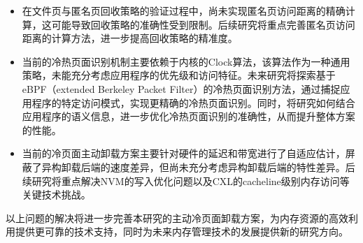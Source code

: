 \begin{itemize}
    \item 在文件页与匿名页回收策略的验证过程中，尚未实现匿名页访问距离的精确计算，这可能导致回收策略的准确性受到限制。后续研究将重点完善匿名页访问距离的计算方法，进一步提高回收策略的精准度。

    \item 当前的冷热页面识别机制主要依赖于内核的Clock算法，该算法作为一种通用策略，未能充分考虑应用程序的优先级和访问特征。未来研究将探索基于eBPF（extended Berkeley Packet Filter）的冷热页面识别方法，通过捕捉应用程序的特定访问模式，实现更精确的冷热页面识别。同时，将研究如何结合应用程序的语义信息，进一步优化冷热页面识别的准确性，从而提升整体方案的性能。

    \item 当前的冷页面主动卸载方案主要针对硬件的延迟和带宽进行了自适应估计，屏蔽了异构卸载后端的速度差异，但尚未充分考虑异构卸载后端的特性差异。后续研究将重点解决NVM的写入优化问题以及CXL的cacheline级别内存访问等关键技术挑战。

\end{itemize}

以上问题的解决将进一步完善本研究的主动冷页面卸载方案，为内存资源的高效利用提供更可靠的技术支持，同时为未来内存管理技术的发展提供新的研究方向。